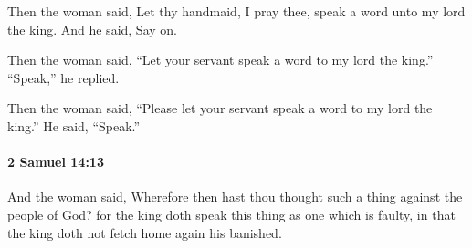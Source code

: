 			\begin{versebox}
					\item[BHS] 
					\item[ASV] Then the woman said, Let thy handmaid, I pray thee, speak a word unto my lord the king. And he said, Say on.
					\item[NIV] Then the woman said, “Let your servant speak a word to my lord the king.” “Speak,” he replied.
					\item[NRSV] Then the woman said, “Please let your servant speak a word to my lord the king.” He said, “Speak.”
			\end{versebox}

		\paragraph{2 Samuel 14:13} %
			\label{2SAMUEL-14-13}

			And the woman said, Wherefore then hast thou thought such a thing against the people of God? for the king doth speak this thing as one which is faulty, in that the king doth not fetch home again his banished.

